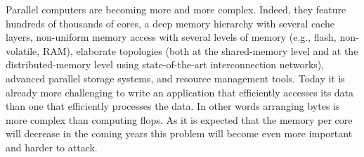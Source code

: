 %   
%   
%   
%   
%   
%   
%    

Parallel computers are becoming more and more complex.  Indeed, they
feature hundreds of thousands of cores, a deep memory hierarchy with
several cache layers, non-uniform memory access with  several levels of
memory (e.g., flash, non-volatile, RAM), elaborate topologies (both at
the shared-memory level and at the distributed-memory level using
state-of-the-art interconnection networks), advanced parallel storage
systems, and resource management tools.
%
Today it is already more challenging to write an application that
efficiently accesses its data than one that efficiently processes the
data. In other words arranging bytes is more complex than computing
flops. As it is expected that the memory per core will decrease in the
coming years this problem will become even more important and harder to
attack. 

